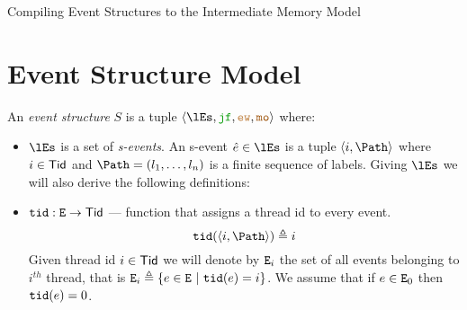 \documentclass[12pt]{article}
\begin{document}
\begin{center}
{\center \LARGE Compiling Event Structures to the Intermediate Memory Model }
\end{center}

\section{Event Structure Model}

\begin{definition}
  \label{def:es}
  
  An \emph{event structure} $S$ is a tuple
  $\tup{\lEs, \lJF, \lEW, \lMO}$ where:
  \begin{itemize}
    \item $\lEs$ is a set of \emph{s-events}.
    An s-event $\hat{e} \in \lEs$ is a tuple $\tup{i, \Path}$
    where $i \in \mathsf{Tid}$ and $\Path = (l_1, \dots, l_n)$ is a finite sequence of labels.
    Giving $\lEs$ we will also derive the following definitions:
    \item ${\mathtt{tid}} : {\mathtt{E}} \rightarrow \mathsf{Tid}$ --- function that assigns a thread id to every event.
      \begin{equation*}
        \lTID(\tup{i, \Path}) \defeq i
      \end{equation*}
      Given thread id $i \in \mathsf{Tid}$ we will denote by ${\mathtt{E}}_{i}$ the set of all events belonging 
      to $i^{th}$ thread, that is ${\mathtt{E}}_{i} \triangleq \{e \in {\mathtt{E}} ~|~ {\mathtt{tid}}(e) = i\}$.
      We assume that if $e \in {\mathtt{E}}_{0}$ then ${\mathtt{tid}}(e) = 0$.
    

\end{itemize}
\end{definition}
\end{document}
